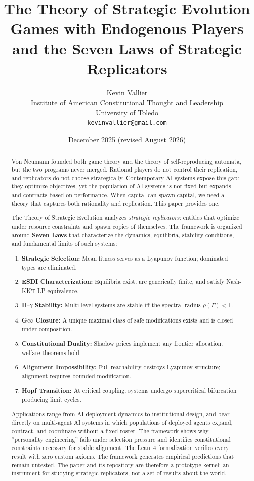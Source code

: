 \documentclass[12pt]{article}
\title{\textbf{The Theory of Strategic Evolution}\\[0.5em]\large Games with Endogenous Players and the Seven Laws of Strategic Replicators}
\author{Kevin Vallier\\[0.3em]
\small Institute of American Constitutional Thought and Leadership\\
\small University of Toledo\\[0.3em]
\small\texttt{kevinvallier@gmail.com}}
\date{December 2025 (revised August 2026)}
\begin{document}
\maketitle

\begin{abstract}
Von Neumann founded both game theory and the theory of self-reproducing automata, but the two programs never merged. Rational players do not control their replication, and replicators do not choose strategically. Contemporary AI systems expose this gap: they optimize objectives, yet the population of AI systems is not fixed but expands and contracts based on performance. When capital can spawn capital, we need a theory that captures both rationality and replication. This paper provides one.

The Theory of Strategic Evolution analyzes \emph{strategic replicators}: entities that optimize under resource constraints and spawn copies of themselves. The framework is organized around \textbf{Seven Laws} that characterize the dynamics, equilibria, stability conditions, and fundamental limits of such systems:

\begin{enumerate}
\item \textbf{Strategic Selection:} Mean fitness serves as a Lyapunov function; dominated types are eliminated.
\item \textbf{ESDI Characterization:} Equilibria exist, are generically finite, and satisfy Nash-KKT-LP equivalence.
\item \textbf{H-$\gamma$ Stability:} Multi-level systems are stable iff the spectral radius $\rho(\Gamma) < 1$.
\item \textbf{G$\infty$ Closure:} A unique maximal class of safe modifications exists and is closed under composition.
\item \textbf{Constitutional Duality:} Shadow prices implement any frontier allocation; welfare theorems hold.
\item \textbf{Alignment Impossibility:} Full reachability destroys Lyapunov structure; alignment requires bounded modification.
\item \textbf{Hopf Transition:} At critical coupling, systems undergo supercritical bifurcation producing limit cycles.
\end{enumerate}

Applications range from AI deployment dynamics to institutional design, and bear directly on multi-agent AI systems in which populations of deployed agents expand, contract, and coordinate without a fixed roster. The framework shows why ``personality engineering'' fails under selection pressure and identifies constitutional constraints necessary for stable alignment. The Lean~4 formalization verifies every result with zero custom axioms. The framework generates empirical predictions that remain untested. The paper and its repository are therefore a prototype kernel: an instrument for studying strategic replicators, not a set of results about the world.
\end{abstract}
\end{document}
